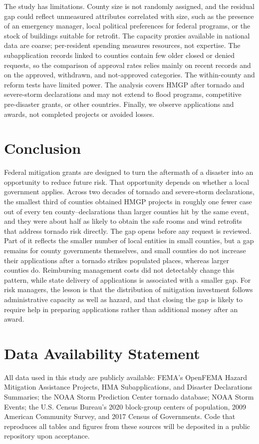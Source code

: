 \documentclass[12pt]{article}
\begin{document}
The study has limitations. County size is not randomly assigned, and the residual gap could reflect unmeasured attributes correlated with size, such as the presence of an emergency manager, local political preferences for federal programs, or the stock of buildings suitable for retrofit. The capacity proxies available in national data are coarse; per-resident spending measures resources, not expertise. The subapplication records linked to counties contain few older closed or denied requests, so the comparison of approval rates relies mainly on recent records and on the approved, withdrawn, and not-approved categories. The within-county and reform tests have limited power. The analysis covers HMGP after tornado and severe-storm declarations and may not extend to flood programs, competitive pre-disaster grants, or other countries. Finally, we observe applications and awards, not completed projects or avoided losses.

\section{Conclusion}

Federal mitigation grants are designed to turn the aftermath of a disaster into an opportunity to reduce future risk. That opportunity depends on whether a local government applies. Across two decades of tornado and severe-storm declarations, the smallest third of counties obtained HMGP projects in roughly one fewer case out of every ten county--declarations than larger counties hit by the same event, and they were about half as likely to obtain the safe rooms and wind retrofits that address tornado risk directly. The gap opens before any request is reviewed. Part of it reflects the smaller number of local entities in small counties, but a gap remains for county governments themselves, and small counties do not increase their applications after a tornado strikes populated places, whereas larger counties do. Reimbursing management costs did not detectably change this pattern, while state delivery of applications is associated with a smaller gap. For risk managers, the lesson is that the distribution of mitigation investment follows administrative capacity as well as hazard, and that closing the gap is likely to require help in preparing applications rather than additional money after an award.

\section*{Data Availability Statement}
All data used in this study are publicly available: FEMA's OpenFEMA Hazard Mitigation Assistance Projects, HMA Subapplications, and Disaster Declarations Summaries; the NOAA Storm Prediction Center tornado database; NOAA Storm Events; the U.S. Census Bureau's 2020 block-group centers of population, 2009 American Community Survey, and 2017 Census of Governments. Code that reproduces all tables and figures from these sources will be deposited in a public repository upon acceptance.
\end{document}
